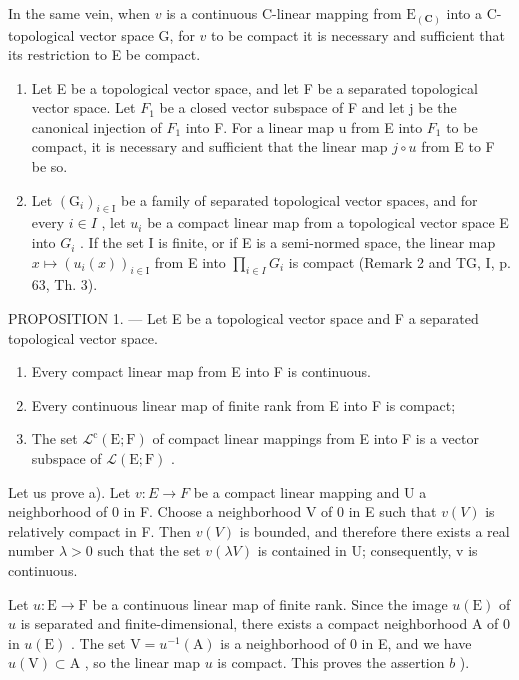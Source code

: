 In the same vein, when \(v\) is a continuous C-linear mapping from \(\mathrm{E}_{(\mathbf{C})}\) into a C-topological vector space G, for \(v\) to be compact it is necessary and sufficient that its restriction to E be compact.

\begin{enumerate}
\def\labelenumi{\arabic{enumi})}
\setcounter{enumi}{4}
\item
  Let E be a topological vector space, and let F be a separated topological vector space. Let \(F_{1}\) be a closed vector subspace of F and let j be the canonical injection of \(F_{1}\) into F. For a linear map u from E into \(F_{1}\) to be compact, it is necessary and sufficient that the linear map \(j \circ u\) from E to F be so.
\item
  Let \((\mathrm{G}_{i})_{i\in\mathrm{I}}\) be a family of separated topological vector spaces, and for every \(i\in I\) , let \(u_{i}\) be a compact linear map from a topological vector space E into \(G_{i}\) . If the set I is finite, or if E is a semi-normed space, the linear map \(x\mapsto(u_{i}(x))_{i\in\mathrm{I}}\) from E into \(\prod_{i\in I}G_{i}\) is compact (Remark 2 and TG, I, p. 63, Th. 3).
\end{enumerate}

PROPOSITION 1. --- Let E be a topological vector space and F a separated topological vector space.

\begin{enumerate}
\def\labelenumi{\alph{enumi})}
\item
  Every compact linear map from E into F is continuous.
\item
  Every continuous linear map of finite rank from E into F is compact;
\item
  The set \(\mathcal{L}^{\mathrm{c}}(\mathrm{E};\mathrm{F})\) of compact linear mappings from E into F is a vector subspace of \(\mathcal{L}(\mathrm{E};\mathrm{F})\) .
\end{enumerate}

Let us prove a). Let \(v: E \rightarrow F\) be a compact linear mapping and U a neighborhood of 0 in F. Choose a neighborhood V of 0 in E such that \(v(V)\) is relatively compact in F. Then \(v(V)\) is bounded, and therefore there exists a real number \(\lambda > 0\) such that the set \(v(\lambda V)\) is contained in U; consequently, v is continuous.

Let \(u \colon \mathrm{E} \to \mathrm{F}\) be a continuous linear map of finite rank. Since the image \(u(\mathrm{E})\) of \(u\) is separated and finite-dimensional, there exists a compact neighborhood A of 0 in \(u(\mathrm{E})\) . The set \(\mathrm{V} = u^{-1}(\mathrm{A})\) is a neighborhood of 0 in E, and we have \(u(\mathrm{V}) \subset \mathrm{A}\) , so the linear map \(u\) is compact. This proves the assertion \(b\) ).

